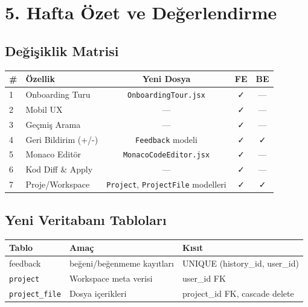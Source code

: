 \documentclass[12pt,a4paper]{article}
\begin{document}
\newpage

\section{5. Hafta Özet ve Değerlendirme}

\subsection{Değişiklik Matrisi}

\begin{tabularx}{\textwidth}{lXccc}
\toprule
\textbf{\#} & \textbf{Özellik} & \textbf{Yeni Dosya} & \textbf{FE} & \textbf{BE} \\
\midrule
1 & Onboarding Turu      & \texttt{OnboardingTour.jsx}               & \textcolor{successgreen}{✓} & — \\
2 & Mobil UX             & —                                         & \textcolor{successgreen}{✓} & — \\
3 & Geçmiş Arama         & —                                         & \textcolor{successgreen}{✓} & — \\
4 & Geri Bildirim (+/-)  & \texttt{Feedback} modeli                  & \textcolor{successgreen}{✓} & \textcolor{successgreen}{✓} \\
5 & Monaco Editör        & \texttt{MonacoCodeEditor.jsx}             & \textcolor{successgreen}{✓} & — \\
6 & Kod Diff \& Apply    & —                                         & \textcolor{successgreen}{✓} & — \\
7 & Proje/Workspace      & \texttt{Project}, \texttt{ProjectFile} modelleri & \textcolor{successgreen}{✓} & \textcolor{successgreen}{✓} \\
\bottomrule
\end{tabularx}

\subsection{Yeni Veritabanı Tabloları}

\begin{tabular}{lll}
\toprule
\textbf{Tablo} & \textbf{Amaç} & \textbf{Kısıt} \\
\midrule
feedback}      & beğeni/beğenmeme kayıtları    & UNIQUE (history\_id, user\_id) \\
\texttt{project}       & Workspace meta verisi & user\_id FK \\
\texttt{project\_file} & Dosya içerikleri      & project\_id FK, cascade delete \\
\bottomrule
\end{tabular}
\end{document}
